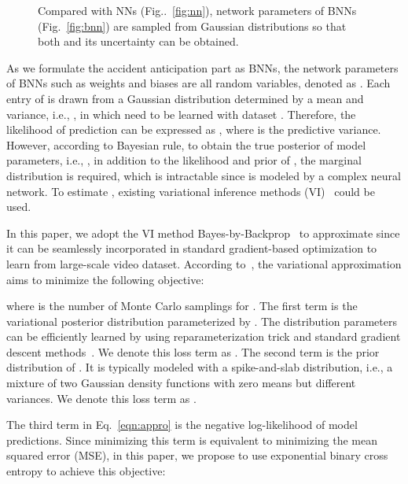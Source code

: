 \documentclass[sigconf]{acmart}
\begin{document}
\begin{figure}
\centering
    \begin{minipage}[b]{0.48\textwidth}
      \centering
      \centering
      \end{minipage}
    \caption{Compared with NNs (Fig..~\ref{fig:nn}), network parameters of BNNs (Fig.~\ref{fig:bnn}) are sampled from Gaussian distributions so that both  and its uncertainty can be obtained.}
    \label{fig:comp_nns}
\end{figure}

As we formulate the accident anticipation part as BNNs, the network parameters of BNNs such as weights and biases are all random variables, denoted as . Each entry of  is drawn from a Gaussian distribution determined by a mean and variance, i.e., , in which  need to be learned with dataset . Therefore, the likelihood of prediction can be expressed as , where  is the predictive variance. However, according to Bayesian rule, to obtain the true posterior of model parameters, i.e., , in addition to the likelihood and prior of , the marginal distribution  is required, which is intractable since  is modeled by a complex neural network. To estimate , existing variational inference methods (VI)~\cite{GravesNIPS2011,BlundellJMLR2015,GalICLRW2016} could be used.

In this paper, we adopt the VI method Bayes-by-Backprop~\cite{BlundellJMLR2015} to approximate  since it can be seamlessly incorporated in standard gradient-based optimization to learn from large-scale video dataset. According to~\cite{BlundellJMLR2015}, the variational approximation aims to minimize the following objective:

where  is the number of Monte Carlo samplings for . The first term   is the variational posterior distribution parameterized by . The distribution parameters  can be efficiently learned by using reparameterization trick and standard gradient descent methods~\cite{BlundellJMLR2015}. We denote this loss term as . The second term  is the prior distribution of . It is typically modeled with a spike-and-slab distribution, i.e., a mixture of two Gaussian density functions with zero means but different variances. We denote this loss term as .

The third term in Eq.~\ref{eqn:appro} is the negative log-likelihood of model predictions. Since minimizing this term is equivalent to minimizing the mean squared error (MSE), in this paper, we propose to use exponential binary cross entropy to achieve this objective:
\end{document}
